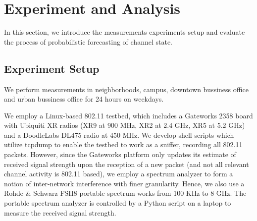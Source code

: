 \section{Experiment and Analysis}
\label{sec:experiment}

In this section, we introduce the measurements experiments setup and 
evaluate the process of probabilistic forecasting of channel state.

\subsection{Experiment Setup}
\label{subsec:experimentdesign}

We perform measurements in neighborhoods, campus, downtown bussiness office and 
urban bussiness office for 24 hours on weekdays. 


We employ a Linux-based 802.11 testbed, which includes a Gateworks 2358 board with 
Ubiquiti XR radios (XR9 at 900 MHz, XR2 at 2.4 GHz, XR5 at 5.2 GHz) and a DoodleLabs DL475 
radio at 450 MHz.  We develop shell scripts which utilize tcpdump to enable the testbed to
work as a sniffer, recording all 802.11 packets. However, since the Gateworks platform only 
updates its estimate of received signal strength upon the reception of a new packet (and
not all relevant channel activity is 802.11 based), we employ a spectrum analyzer to form 
a notion of inter-network interference with finer granularity.  Hence, we also use a Rohde \& Schwarz FSH8 
portable spectrum works from 100 KHz to 8 GHz. The portable spectrum analyzer is controlled 
by a Python script on a laptop to measure the received signal strength.



